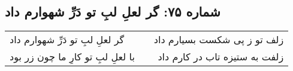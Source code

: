 \begin{center}
\section*{شماره ۷۵: گر لعلِ لبِ تو دَرِّ شهوارم داد}
\label{sec:075}
\begin{longtable}{l p{0.5cm} r}
گر لعلِ لبِ تو دَرِّ شهوارم داد
&&
زلف تو ز پی شکست بسیارم داد
\\
با لعلِ لبِ تو کارِ ما چون زر بود
&&
زلفت به ستیزه تاب در کارم داد
\\
\end{longtable}
\end{center}
